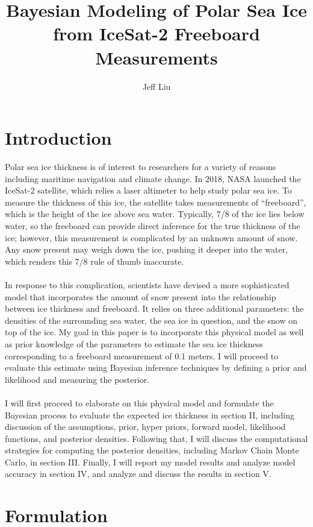 \documentclass[12pt, letterpaper]{article}
\author{Jeff Liu}
\title{Bayesian Modeling of Polar Sea Ice from IceSat-2 Freeboard Measurements}
\begin{document}
\maketitle

\section{Introduction}

Polar sea ice thickness is of interest to researchers for a variety of reasons including maritime navigation and climate change.
In 2018, NASA launched the IceSat-2 satellite, which relies a laser altimeter to help study polar sea ice.
To measure the thickness of this ice, the satellite takes measurements of ``freeboard'', which is the height of the ice above sea water.
Typically, 7/8 of the ice lies below water, so the freeboard can provide direct inference for the true thickness of the ice;
however, this measurement is complicated by an unknown amount of snow. Any snow present may weigh down the ice, pushing it deeper into the water,
which renders this 7/8 rule of thumb inaccurate.
\\\\
In response to this complication, scientists have devised a more sophisticated model that incorporates the amount of snow present into
the relationship between ice thickness and freeboard.
It relies on three additional parameters: the densities of the surrounding sea water, the sea ice in question, and the snow on top of the ice.
My goal in this paper is to incorporate this physical model as well as prior knowledge of the parameters to estimate the sea ice thickness
corresponding to a freeboard measurement of 0.1 meters. I will proceed to evaluate this estimate using Bayesian inference techniques
by defining a prior and likelihood and measuring the posterior.
\\\\
I will first proceed to elaborate on this physical model and formulate the Bayesian process to evaluate the expected ice thickness in section II,
including discussion of the assumptions, prior, hyper priors, forward model, likelihood functions, and posterior densities.
Following that, I will discuss the computational strategies for computing the posterior densities, including Markov Chain Monte Carlo,
in section III. Finally, I will report my model results and analyze model accuracy in section IV, and analyze and discuss the results in section V.

\newpage
\section{Formulation}
\end{document}
